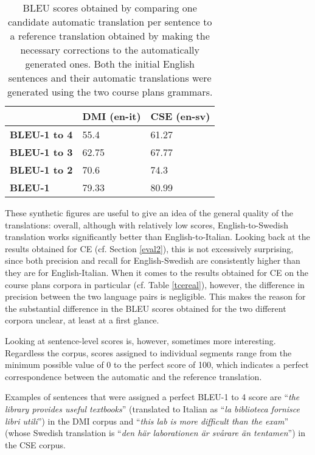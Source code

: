 \begin{table}[h]
    \centering
    \begin{tabular}{|l|l|l|}
    \hline
    \textbf{}            & \textbf{DMI (en-it)} & \textbf{CSE (en-sv)} \\ \hline
    \textbf{BLEU-1 to 4} & 55.4          & 61.27         \\ \hline
    \textbf{BLEU-1 to 3} & 62.75         & 67.77         \\ \hline
    \textbf{BLEU-1 to 2} & 70.6          & 74.3          \\ \hline
    \textbf{BLEU-1}      & 79.33         & 80.99         \\ \hline
    \end{tabular}
    \caption[BLEU scores for automatic translations based on the course plans grammars]{BLEU scores obtained by comparing one candidate automatic translation per sentence to a reference translation obtained by making the necessary corrections to the automatically generated ones. Both the initial English sentences and their automatic translations were generated using the two course plans grammars.}
    \label{tbleu}
    \end{table}

These synthetic figures are useful to give an idea of the general quality of the translations: overall, although with relatively low scores, English-to-Swedish translation works significantly better than English-to-Italian. 
Looking back at the results obtained for CE (cf. Section \ref{eval2}), this is not excessively surprising, since both precision and recall for English-Swedish are consistently higher than they are for English-Italian. 
When it comes to the results obtained for CE on the course plans corpora in particular (cf. Table \ref{tcereal}), however, the difference in precision between the two language pairs is negligible.
This makes the reason for the substantial difference in the BLEU scores obtained for the two different corpora unclear, at least at a first glance.\smallskip

Looking at sentence-level scores is, however, sometimes more interesting. 
Regardless the corpus, scores assigned to individual segments range from the minimum possible value of 0 to the perfect score of 100, which indicates a perfect correspondence between the automatic and the reference translation. \smallskip

Examples of sentences that were assigned a perfect BLEU-1 to 4 score are ``\textit{the library provides useful textbooks}'' (translated to Italian as ``\textit{la biblioteca fornisce libri utili}'') in the DMI corpus and ``\textit{this lab is more difficult than the exam}'' (whose Swedish translation is ``\textit{den här laborationen är svårare än tentamen}'') in the CSE corpus. \smallskip

